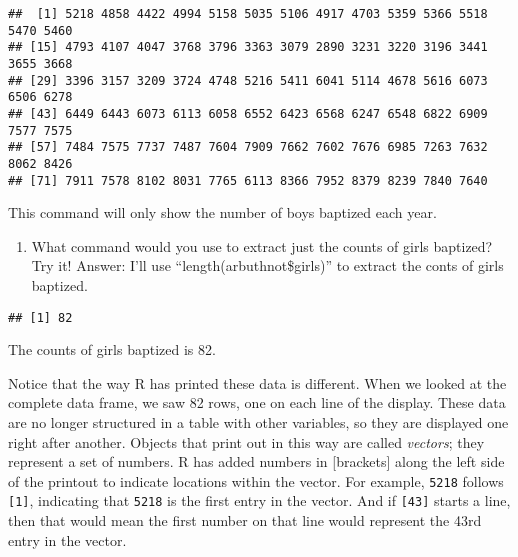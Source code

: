 \documentclass[]{article}
\newenvironment{Shaded}{\begin{snugshade}}{\end{snugshade}}
\newcommand{\KeywordTok}[1]{\textcolor[rgb]{0.13,0.29,0.53}{\textbf{#1}}}
\newcommand{\OperatorTok}[1]{\textcolor[rgb]{0.81,0.36,0.00}{\textbf{#1}}}
\newcommand{\NormalTok}[1]{#1}
\providecommand{\tightlist}{%
  \setlength{\itemsep}{0pt}\setlength{\parskip}{0pt}}
\begin{document}
\begin{Shaded}
\end{Shaded}

\begin{verbatim}
##  [1] 5218 4858 4422 4994 5158 5035 5106 4917 4703 5359 5366 5518 5470 5460
## [15] 4793 4107 4047 3768 3796 3363 3079 2890 3231 3220 3196 3441 3655 3668
## [29] 3396 3157 3209 3724 4748 5216 5411 6041 5114 4678 5616 6073 6506 6278
## [43] 6449 6443 6073 6113 6058 6552 6423 6568 6247 6548 6822 6909 7577 7575
## [57] 7484 7575 7737 7487 7604 7909 7662 7602 7676 6985 7263 7632 8062 8426
## [71] 7911 7578 8102 8031 7765 6113 8366 7952 8379 8239 7840 7640
\end{verbatim}

This command will only show the number of boys baptized each year.

\begin{enumerate}
\def\labelenumi{\arabic{enumi}.}
\tightlist
\item
  What command would you use to extract just the counts of girls
  baptized? Try it! Answer: I'll use ``length(arbuthnot\$girls)'' to
  extract the conts of girls baptized.
\end{enumerate}

\begin{Shaded}
\end{Shaded}

\begin{verbatim}
## [1] 82
\end{verbatim}

The counts of girls baptized is 82.

Notice that the way R has printed these data is different. When we
looked at the complete data frame, we saw 82 rows, one on each line of
the display. These data are no longer structured in a table with other
variables, so they are displayed one right after another. Objects that
print out in this way are called \emph{vectors}; they represent a set of
numbers. R has added numbers in {[}brackets{]} along the left side of
the printout to indicate locations within the vector. For example,
\texttt{5218} follows \texttt{{[}1{]}}, indicating that \texttt{5218} is
the first entry in the vector. And if \texttt{{[}43{]}} starts a line,
then that would mean the first number on that line would represent the
43rd entry in the vector.
\end{document}
